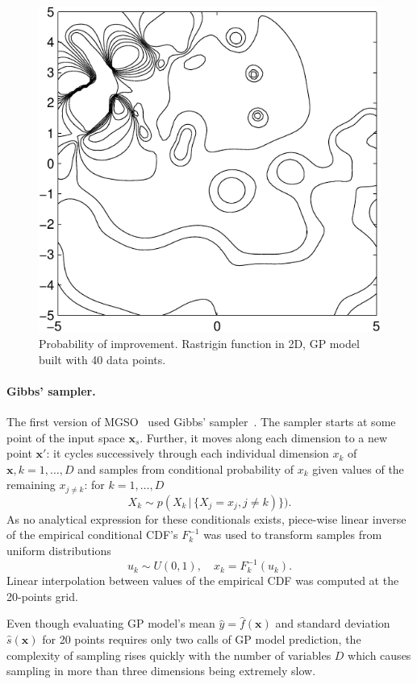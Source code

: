 \documentclass{itatnew}
\newcommand{\xx}{\mathrm{\mathbf{x}}}
\begin{document}
\begin{figure}
  \centering
  \includegraphics[width=0.6\linewidth]{poi_example}
  {\small
  \caption{Probability of improvement. Rastrigin function in 2D, GP model built with 40 data points.
  \label{fig:poi}
  }
  }
\end{figure}

\paragraph{Gibbs' sampler.}

The first version of MGSO~\cite{bajer_model_2013} used Gibbs' sampler~\cite{geman_stochastic_1984}. The sampler starts at some point of the input space $\xx_s$. Further, it moves along each dimension to a new point $\xx'$: it cycles successively through each individual dimension $x_k$ of $\xx, k = 1,\ldots,D$ and samples from conditional probability of $x_k$ given values of the remaining $x_{j \neq k}$: for $k=1,\ldots,D$
\begin{equation}
X_k \sim p(X_k \, | \, \{X_j = x_j, j \neq k)\}).
\end{equation}
As no analytical expression for these conditionals exists, piece-wise linear inverse of the empirical conditional CDF's $F^{-1}_k$ was used to transform samples from uniform distributions
\begin{displaymath}
u_k \sim U(0,1), \quad  x_k = F^{-1}_k(u_k).
\end{displaymath}
Linear interpolation between values of the empirical CDF was computed at the 20-points grid.

Even though evaluating GP model's mean $\hat{y} = \hat{f}(\xx)$ and standard deviation $\hat{s}(\xx)$ for 20 points requires only two calls of GP model prediction, the complexity of sampling rises quickly with the number of variables $D$ which causes sampling in more than three dimensions being extremely slow.
\end{document}
